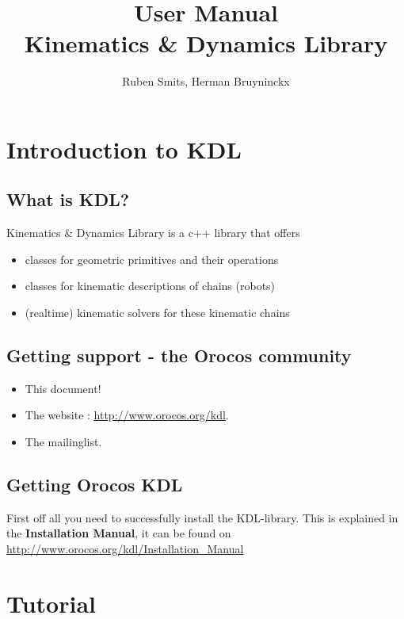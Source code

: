 \documentclass[a4paper,10pt]{report}
\title{User Manual \\ Kinematics \& Dynamics Library}
\author{Ruben Smits, Herman Bruyninckx}
\begin{document}
\lstset{language=c++}

\maketitle

\chapter{Introduction to KDL}
\label{cha:introduction-kdl}

\section{What is KDL?}
\label{sec:what-kdl}
Kinematics \& Dynamics Library is a c++ library that offers

\begin{itemize}
\item classes for geometric primitives and their operations
\item classes for kinematic descriptions of chains (robots)
\item (realtime) kinematic solvers for these kinematic chains
\end{itemize}

\section{Getting support - the Orocos community}
\label{sec:gett-supp-oroc}

\begin{itemize}
\item This document!
\item The website : \url{http://www.orocos.org/kdl}.
\item The mailinglist. 
\end{itemize}


\section{Getting Orocos KDL}
\label{sec:getting-orocos-kdl}

First off all you need to successfully install the KDL-library. This is
explained in the \textbf{Installation Manual}, it can be found on
\url{http://www.orocos.org/kdl/Installation_Manual}


\chapter{Tutorial}
\label{cha:tutorial}
\end{document}
